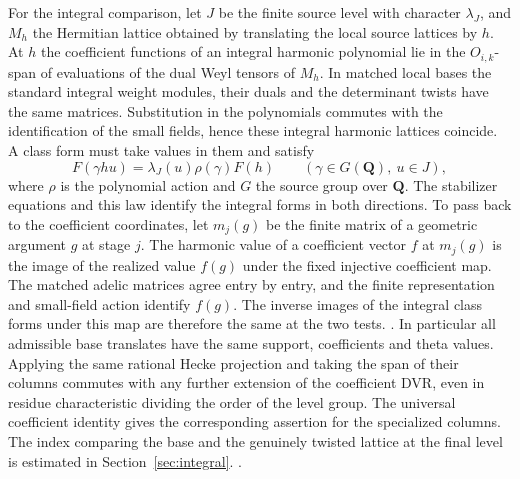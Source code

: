 For the integral comparison, let \(J\) be the finite source
level with character \(\lambda_J\), and \(M_h\) the Hermitian
lattice obtained by translating the local source lattices by
\(h\). At \(h\) the coefficient functions of an integral
harmonic polynomial lie in the \(O_{i,k}\)-span of evaluations
of the dual Weyl tensors of \(M_h\). In matched local bases the
standard integral weight modules, their duals and the determinant
twists have the same matrices. Substitution in the polynomials
commutes with the identification of the small fields, hence these
integral harmonic lattices coincide. A class form must take
values in them and satisfy
\[
 F(\gamma h u)=\lambda_J(u)\rho(\gamma)F(h)
 \qquad(\gamma\in G(\mathbf Q),\ u\in J),
\]
where \(\rho\) is the polynomial action and \(G\) the source
group over \(\mathbf Q\). The stabilizer equations and this law
identify the integral forms in both directions. To pass back to
the coefficient coordinates, let \(m_j(g)\) be the finite matrix
of a geometric argument \(g\) at stage \(j\). The harmonic value
of a coefficient vector \(f\) at \(m_j(g)\) is the image of
the realized value \(f(g)\) under the fixed injective coefficient
map. The matched adelic matrices agree entry by entry, and the
finite representation and small-field action identify \(f(g)\).
The inverse images of the integral class forms under this map
are therefore the same at the two tests.
.
In particular all
admissible base translates have the same support, coefficients
and theta values. Applying the same rational Hecke projection
and taking the span of their columns commutes with any further
extension of the coefficient DVR, even in residue characteristic
dividing the order of the level group. The universal coefficient
identity gives the corresponding assertion for the specialized
columns. The index comparing the base and the genuinely twisted
lattice at the final level is estimated in Section~\ref{sec:integral}.
.

